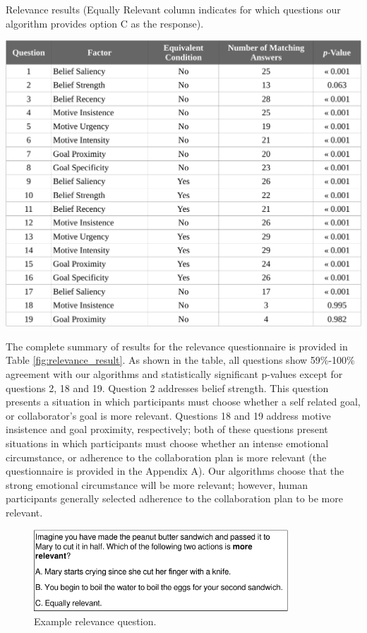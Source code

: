 \documentclass[12pt]{report}
\begin{document}
\begin{table}[tbh]
  \centering
  \caption{Relevance results {\color{red}(Equally Relevant column indicates
  for which questions our algorithm provides option C as the response)}.}
  \label{fig:relevance_result}
  \vspace*{-3mm}
  \includegraphics[width=1\textwidth]{figure/relevance_result_croped.pdf}
\end{table}

The complete summary of results for the relevance questionnaire is provided in
Table \ref{fig:relevance_result}. As shown in the table, all questions show
59\%-100\% agreement with our algorithms and statistically significant p-values
except for questions 2, 18 and 19. Question 2 addresses belief strength.
{\color{red} This question presents a situation in which participants must
choose whether a self related goal, or collaborator's goal is more relevant.}
Questions 18 and 19 address motive insistence and goal proximity, respectively;
both of these questions present situations in which participants must choose
whether an intense emotional circumstance, or adherence to the collaboration
plan is more relevant (the questionnaire is provided in the Appendix A). Our
algorithms choose that the strong emotional circumstance will be more relevant;
however, human participants generally selected adherence to the collaboration
plan to be more relevant.

\begin{figure}[tbh]
  \centering
  \includegraphics[width=0.85\textwidth]{figure/question-sample4-croped.pdf}
  \caption{{Example relevance question.}}
  \label{fig:qs4}
\end{figure}
\end{document}

